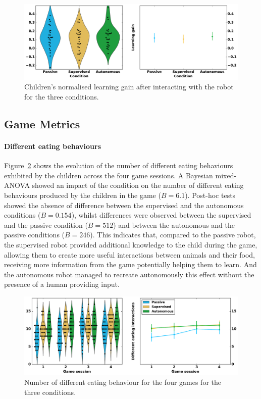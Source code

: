 \begin{figure}[ht]
	\includegraphics[width=1\linewidth]{learning.pdf}
	\centering
	\caption{Children's normalised learning gain after interacting with the robot for the three conditions.}
	\label{fig:tutoring_learning}
\end{figure}

\subsection{Game Metrics}

\paragraph{Different eating behaviours}
Figure~\ref{fig:tutoring_d_eat} shows the evolution of the number of different eating behaviours exhibited by the children across the four game sessions. A Bayesian mixed-ANOVA showed an impact of the condition on the number of different eating behaviours produced by the children in the game ($B=6.1$). Post-hoc tests showed the absence of difference between the supervised and the autonomous conditions ($B=0.154$), whilst differences were observed between the supervised and the passive condition ($B=512$) and between the autonomous and the passive conditions ($B=246$). This indicates that, compared to the passive robot, the supervised robot provided additional knowledge to the child during the game, allowing them to create more useful interactions between animals and their food, receiving more information from the game potentially helping them to learn. And the autonomous robot managed to recreate autonomously this effect without the presence of a human providing input.

\begin{figure}[ht]
	\includegraphics[width=1\linewidth]{d_eat.pdf}
	\centering
	\caption{Number of different eating behaviour for the four games for the three conditions.}
	\label{fig:tutoring_d_eat}
\end{figure}

